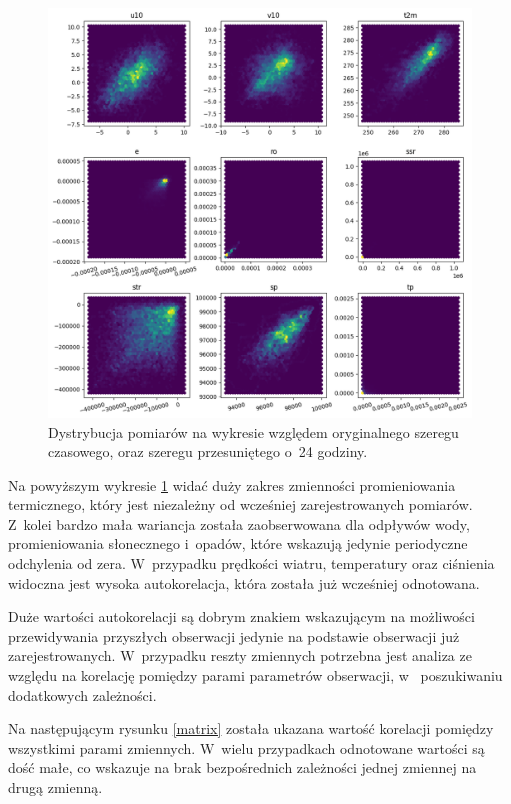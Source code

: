 \begin{figure}[H]
    \centering
    \includegraphics[width=\textwidth]{images/autocorrelation_hex.png}
    \caption{Dystrybucja pomiarów na wykresie względem oryginalnego szeregu czasowego,
    oraz szeregu przesuniętego o~24 godziny.}
    \label{hex}
\end{figure}

Na powyższym wykresie \ref{hex} widać duży zakres zmienności promieniowania termicznego,
który jest niezależny od wcześniej zarejestrowanych pomiarów. Z~kolei bardzo mała wariancja 
została zaobserwowana dla odpływów wody, promieniowania słonecznego i~opadów, które wskazują 
jedynie periodyczne odchylenia od zera. W~przypadku prędkości wiatru, temperatury oraz 
ciśnienia widoczna jest wysoka autokorelacja, która została już wcześniej odnotowana. 

Duże wartości autokorelacji są dobrym znakiem wskazującym na możliwości przewidywania przyszłych
obserwacji jedynie na podstawie obserwacji już zarejestrowanych. W~przypadku reszty zmiennych
potrzebna jest analiza ze względu na korelację pomiędzy parami parametrów obserwacji, w~
poszukiwaniu dodatkowych zależności.

Na następującym rysunku \ref{matrix} została ukazana wartość korelacji pomiędzy wszystkimi 
parami zmiennych. W~wielu przypadkach odnotowane wartości są dość małe, co wskazuje na brak
bezpośrednich zależności jednej zmiennej na drugą zmienną. 

